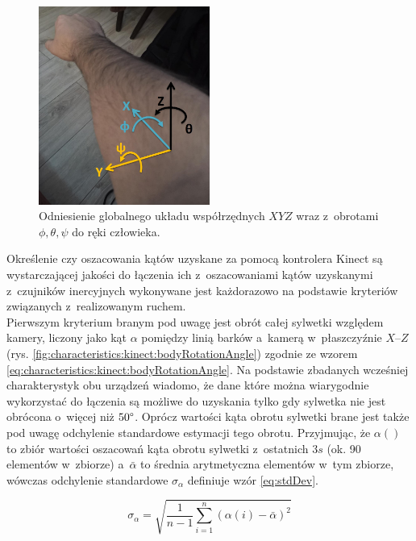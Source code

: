 \begin{figure}[!htb]
	\centering	
	\includegraphics[width=0.5\textwidth]{images/handAxes.jpg}	
	\caption{Odniesienie globalnego układu współrzędnych $XYZ$ wraz z~obrotami $\phi , \theta , \psi$ do ręki człowieka.}
	\label{fig:handAxes}
\end{figure}

Określenie czy oszacowania kątów uzyskane za pomocą kontrolera Kinect są wystarczającej jakości do łączenia ich z~oszacowaniami kątów uzyskanymi z~czujników inercyjnych wykonywane jest każdorazowo na podstawie kryteriów związanych z~realizowanym ruchem. \\
Pierwszym kryterium branym pod uwagę jest obrót całej sylwetki względem kamery, liczony jako kąt $\alpha$ pomiędzy linią barków a~kamerą w~płaszczyźnie $X$--$Z$ (rys. \ref{fig:characteristics:kinect:bodyRotationAngle}) zgodnie ze wzorem \eqref{eq:characteristics:kinect:bodyRotationAngle}. Na podstawie zbadanych wcześniej charakterystyk obu urządzeń wiadomo, że dane które można wiarygodnie wykorzystać do łączenia są możliwe do uzyskania tylko gdy sylwetka nie jest obrócona o~więcej niż $50\degree$. Oprócz wartości kąta obrotu sylwetki brane jest także pod uwagę odchylenie standardowe estymacji tego obrotu. Przyjmując, że $\alpha()$
to zbiór wartości oszacowań kąta obrotu sylwetki z~ostatnich $3s$ (ok. 90 elementów w~zbiorze) a~$\bar{\alpha}$ to średnia arytmetyczna elementów w~tym zbiorze, wówczas odchylenie standardowe $\sigma_\alpha$ definiuje wzór \eqref{eq:stdDev}.

\begin{equation}
	\sigma_\alpha = \sqrt{\frac{1}{n-1}\sum_{i=1}^{n}{(\alpha(i) - \bar{\alpha})^2}}
	\label{eq:stdDev}
\end{equation}


